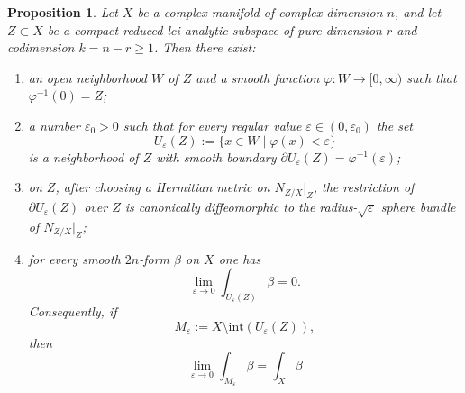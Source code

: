 \documentclass[12pt,a4paper,dvipsnames,x11names]{amsart}
\numberwithin{equation}{section}
\theoremstyle{plain}
\newtheorem{proposition}[theorem]{Proposition}
\theoremstyle{definition}
\theoremstyle{remark}
\begin{document}
\begin{proposition}\label{prop:tubes}
Let $X$ be a complex manifold of complex dimension $n$, and let $Z\subset X$ be a compact reduced lci analytic subspace of pure dimension $r$ and codimension $k=n-r\ge 1$. Then there exist:
\begin{enumerate} 
\item an open neighborhood $W$ of $Z$ and a smooth function $\varphi:W\to [0,\infty)$ such that $\varphi^{-1}(0)=Z$;
\item a number $\varepsilon_0>0$ such that for every regular value $\varepsilon\in (0,\varepsilon_0)$ the set
\begin{equation}\label{eq:Ueps-def}
U_\varepsilon(Z):=\{x\in W\mid \varphi(x)<\varepsilon\}
\end{equation}
is a neighborhood of $Z$ with smooth boundary $\partial U_\varepsilon(Z)=\varphi^{-1}(\varepsilon)$;
\item on $Z$, after choosing a Hermitian metric on $N_{Z/X}|_{Z}$, the restriction of $\partial U_\varepsilon(Z)$ over $Z$ is canonically diffeomorphic to the radius-$\sqrt{\varepsilon}$ sphere bundle of $N_{Z/X}|_{Z}$;
\item for every smooth $2n$-form $\beta$ on $X$ one has
\begin{equation}\label{eq:beta-tube-goes-to-0-prop}
\lim_{\varepsilon\to 0}\int_{U_\varepsilon(Z)}\beta=0.
\end{equation}
Consequently, if
\begin{equation}\label{eq:Meps-local}
M_\varepsilon:=X\setminus \mathrm{int}(U_\varepsilon(Z)),
\end{equation}
then $$\lim_{\varepsilon\to 0}\int_{M_\varepsilon}\beta=\int_X\beta$$
\end{enumerate}
\end{proposition}
\end{document}
